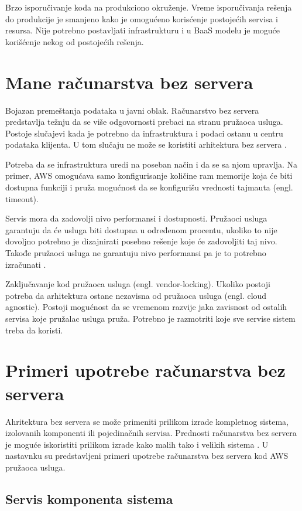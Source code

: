 \documentclass[12pt,oneside]{memoir}
\begin{document}
Brzo isporučivanje koda na produkciono okruženje. Vreme isporučivanja rešenja do produkcije je smanjeno kako je omogućeno korisćenje postojećih servisa i resursa. Nije potrebno postavljati infrastrukturu i u BaaS modelu je moguće korišćenje nekog od postojećih rešenja.

\section{Mane računarstva bez servera}

Bojazan premeštanja podataka u javni oblak. Računarstvo bez servera predstavlja težnju da se više odgovornosti prebaci na stranu pružaoca usluga. Postoje slučajevi kada je potrebno da infrastruktura i podaci ostanu u centru podataka klijenta. U tom slučaju ne može se koristiti arhitektura bez servera \cite{sa}.

Potreba da se infrastruktura uredi na poseban način i da se sa njom upravlja. Na primer, AWS omogućava samo konfigurisanje količine ram memorije koja će biti dostupna funkciji i pruža mogućnost da se konfigurišu vrednosti tajmauta (engl. timeout). %

Servis mora da zadovolji nivo performansi i dostupnosti. Pružaoci usluga garantuju da će usluga biti dostupna u određenom procentu, ukoliko to nije dovoljno potrebno je dizajnirati posebno rešenje koje će zadovoljiti taj nivo. Takođe pružaoci usluga ne garantuju nivo performansi pa je to potrebno izračunati \cite{sa}.

Zaključavanje kod pružaoca usluga (engl. vendor-locking). Ukoliko postoji potreba da arhitektura ostane nezavisna od pružaoca usluga (engl. cloud agnostic). Postoji mogućnost da se vremenom razvije jaka zavisnost od ostalih servisa koje pružalac usluga pruža. Potrebno je razmotriti koje sve servise sistem treba da koristi.
 

\section{Primeri upotrebe računarstva bez servera}

Ahritektura bez servera se može primeniti prilikom izrade kompletnog sistema, izolovanih komponenti ili pojedinačnih servisa. Prednosti računarstva bez servera je moguće iskoristiti prilikom izrade kako malih tako i velikih sistema \cite{sa}. U nastavnku su predstavljeni primeri upotrebe računarstva bez servera kod AWS pružaoca usluga.

\subsection{Servis komponenta sistema}
\end{document}
